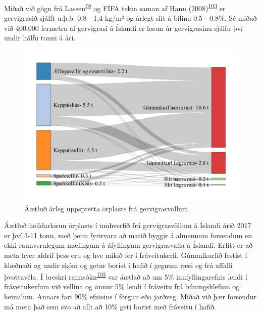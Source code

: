 \documentclass[icelandic,]{book}
\begin{document}
Miðað við gögn frá Lassen\textsuperscript{\protect\hyperlink{ref-lassen2015microplastics}{78}} og FIFA tekin saman af Hann (2008)\textsuperscript{\protect\hyperlink{ref-Hann2018}{103}} er gervigrasið sjálft u.þ.b. 0,8 - 1,4 kg/m² og árlegt slit á bilinu 0.5 - 0.8\%. Sé miðað við 400.000 fermetra af gervigrasi á Íslandi er losun úr gervigrasinu sjálfu því undir hálfu tonni á ári.


\begin{figure}[H]

{\centering \includegraphics{_bookdown_files/OrplastHaf_files/figure-latex/unnamed-chunk-11-1.pdf} 

}

\caption{Áætluð árleg uppspretta örplasts frá gervigrasvöllum.}\label{fig:unnamed-chunk-11-1}
\end{figure}

Áætluð heildarlosun örplasts í umhverfið frá gervigrasvöllum á Íslandi árið 2017 er því 3-11 tonn, með þeim fyrirvara að matið byggir á almennum forsendum en ekki raunverulegum mælingum á áfyllingum gervigrasvalla á Íslandi. Erfitt er að meta hver afdrif þess eru og hve mikið fer í fráveitukerfi. Gúmmíkurlið festist í klæðnaði og undir skóm og getur borist í hafið í gegnum ræsi og frá affalli þvottavéla. Í breskri rannsókn\textsuperscript{\protect\hyperlink{ref-Hann2018}{103}} var áætlað að um 5\% innfyllingarefnis lendi í fráveitukerfum við vellina og önnur 5\% lendi í fráveitu frá búningsklefum og heimilum. Annars fari 90\% efnisins í förgun eða jarðveg. Miðað við þær forsendur má meta það sem svo að allt að 10\% geti borist með fráveitu í hafið.

\end{document}
